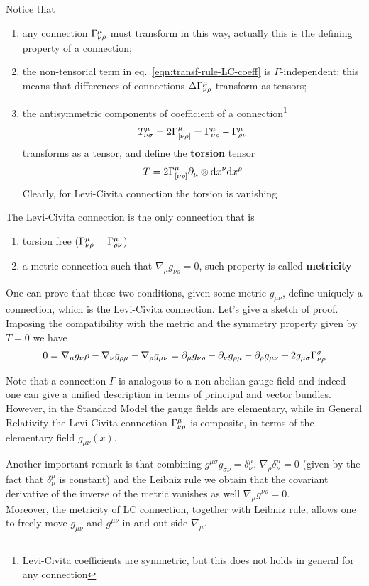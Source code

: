 \documentclass[../main/main.tex]{subfiles}
\begin{document}
Notice that
\begin{enumerate}[label=\textbullet]
\item any connection ${\Gamma}^{\mu}_{\nu \rho}$ must transform in this way, actually this is the defining property of a connection;
\item the non-tensorial term in eq.~\eqref{eqn:transf-rule-LC-coeff} is $\Gamma$-independent: this means that differences of connections $\Delta{\Gamma}^{\mu}_{\nu \rho}$ transform as tensors;
\item the antisymmetric components of coefficient of a connection\footnote{Levi-Civita coefficients are symmetric, but this does not holds in general for any connection}
\[{T}^{\mu}_{\nu\sigma}=2{\Gamma}^{\mu}_{[\nu \rho]}={\Gamma}^{\mu}_{\nu \rho}-{\Gamma}^{\mu}_{\rho \nu}\]
transforms as a tensor, and define the \textbf{torsion} tensor
\[T=2{\Gamma}^{\mu}_{[\nu \rho]}\partial_\mu\otimes\textup{d} x^\nu\textup{d} x^\rho\]
Clearly, for Levi-Civita connection the torsion is vanishing
\end{enumerate}

The Levi-Civita connection is the only connection that is
\begin{enumerate}
\item torsion free (${\Gamma}^{\mu}_{\nu \rho}={\Gamma}^{\mu}_{\rho \nu}$)
\item a metric connection such that $\nabla_\mu g_{\nu\rho}=0$, such property is called \textbf{metricity}
\end{enumerate}
One can prove that these two conditions, given some metric $g_{\mu\nu}$, define uniquely a connection, which is the Levi-Civita connection. Let's give a sketch of proof. Imposing the compatibility with the metric and the symmetry property given by $T=0$ we have
\[0=\nabla_\mu g_\nu\rho-\nabla_\nu g_{\rho\mu}-\nabla_\rho g_{\mu\nu}=\partial_\mu g_{\nu\rho}-\partial_\nu g_{\rho\mu}-\partial_\rho g_{\mu\nu}+2g_{\mu\sigma}{\Gamma}^{\sigma}_{\nu \rho}\]

Note that a connection $\Gamma$ is analogous to a non-abelian gauge field and indeed one can give a unified description in terms of principal and vector bundles. However, in the Standard Model the gauge fields are elementary, while in General Relativity the Levi-Civita connection ${\Gamma}^{\mu}_{\nu \rho}$ is composite, in terms of the elementary field $g_{\mu\nu}(x)$. 

Another important remark is that combining $g^{\mu\sigma}g_{\sigma\nu}=\delta^\mu_\nu$, $\nabla_\rho\delta_\nu^\mu=0$ (given by the fact that $\delta_\nu^\mu$ is constant) and the Leibniz rule we obtain that the covariant derivative of the inverse of the metric vanishes as well $\nabla_\mu g^{\nu\rho}=0$. \\
Moreover, the metricity of LC connection, together with Leibniz rule, allows one to freely move $g_{\mu\nu}$ and $g^{\mu\nu}$ in and out-side $\nabla_\mu$. 
\end{document}
